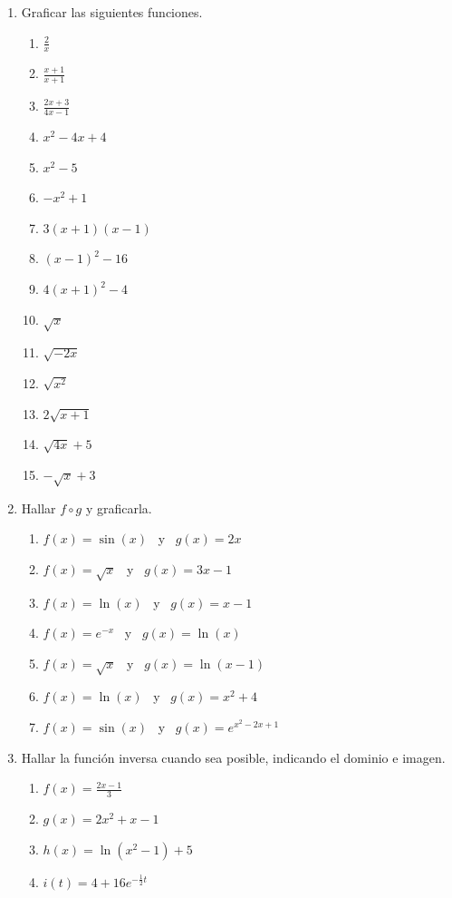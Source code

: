 \documentclass[a4paper]{article}
\newcommand{\exercise}{\item}
\begin{document}
\begin{enumerate}
	\exercise Graficar las siguientes funciones.
	\begin{enumerate} [label=(\alph*)]
		\item $\displaystyle\frac{2}{x}$
		\item $\displaystyle\frac{x+1}{x+1}$
		\item $\displaystyle\frac{2x+3}{4x-1}$
		\item $x^2-4x+4$
		\item $x^2-5$
		\item $-x^2+1$
		\item $3(x+1)(x-1)$
		\item $(x-1)^2-16$
		\item $4(x+1)^2-4$
		\item $\sqrt{x}$
		\item $\sqrt{-2x}$
		\item $\sqrt{x^2}$
		\item $2\sqrt{x+1}$
		\item $\sqrt{4x}+5$
		\item $-\sqrt{x}+3$
	\end{enumerate}

	\exercise Hallar $f \circ g$ y graficarla.
	\begin{enumerate} [label=(\alph*)]
		\item $f(x)=\sin(x)$ ~y~ $g(x)=2x$
		\item $f(x)=\sqrt{x}$ ~y~ $g(x)=3x-1$
		\item $f(x)=\ln(x)$ ~y~ $g(x)=x-1$
		\item $f(x)=\displaystyle{e^{-x}}$ ~y~ $g(x)=\ln(x)$
		\item $f(x)=\sqrt{x}$ ~y~ $g(x)=\ln(x-1)$
		\item $f(x)=\ln(x)$ ~y~ $g(x)=x^2+4$
		\item $f(x)=\sin(x)$ ~y~ $g(x)=\displaystyle{e^{x^2-2x+1}}$
	\end{enumerate}

	\exercise Hallar la función inversa cuando sea posible, indicando el dominio e imagen.
	\begin{enumerate} [label=(\alph*)]
		\item $f(x)=\displaystyle\frac{2x-1}{3}$
		\item $g(x)=2x^2+x-1$
		\item $h(x)=\ln(x^2-1)+5$
		\item $i(t)=\displaystyle{4+16 e^{-\frac{1}{2}t}}$
	\end{enumerate}

\end{enumerate}
\end{document}
